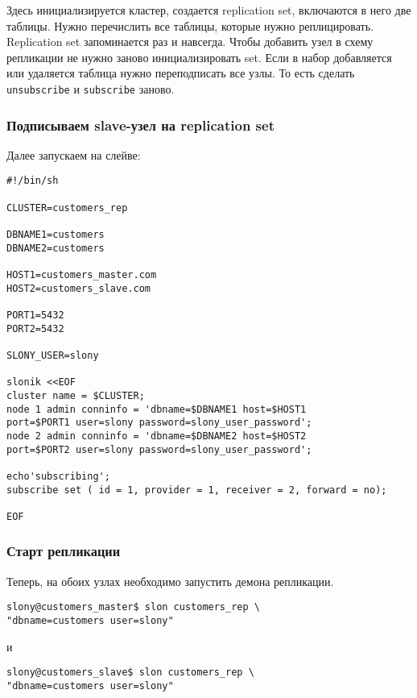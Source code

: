 Здесь инициализируется кластер, создается replication set, включаются в него две таблицы. Нужно перечислить все таблицы, которые нужно реплицировать. Replication set запоминается раз и навсегда. Чтобы добавить узел в схему репликации не нужно заново инициализировать set. Если в набор добавляется или удаляется таблица нужно переподписать все узлы. То есть сделать \lstinline!unsubscribe! и \lstinline!subscribe! заново.

\subsubsection{Подписываем slave-узел на replication set}

Далее запускаем на слейве:

\begin{lstlisting}[label=lst:slony10,caption=Подписываем slave-узел на replication set]
#!/bin/sh

CLUSTER=customers_rep

DBNAME1=customers
DBNAME2=customers

HOST1=customers_master.com
HOST2=customers_slave.com

PORT1=5432
PORT2=5432

SLONY_USER=slony

slonik <<EOF
cluster name = $CLUSTER;
node 1 admin conninfo = 'dbname=$DBNAME1 host=$HOST1
port=$PORT1 user=slony password=slony_user_password';
node 2 admin conninfo = 'dbname=$DBNAME2 host=$HOST2
port=$PORT2 user=slony password=slony_user_password';

echo'subscribing';
subscribe set ( id = 1, provider = 1, receiver = 2, forward = no);

EOF
\end{lstlisting}

\subsubsection{Старт репликации}

Теперь, на обоих узлах необходимо запустить демона репликации.

\begin{lstlisting}[label=lst:slony11,caption=Старт репликации]
slony@customers_master$ slon customers_rep \
"dbname=customers user=slony"
\end{lstlisting}

и

\begin{lstlisting}[label=lst:slony12,caption=Старт репликации]
slony@customers_slave$ slon customers_rep \
"dbname=customers user=slony"
\end{lstlisting}

